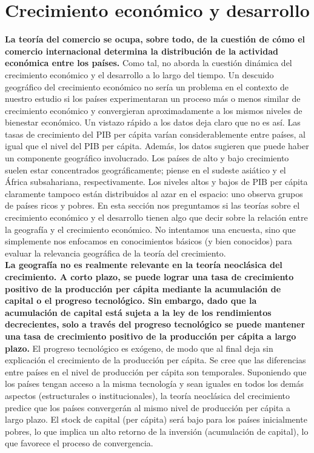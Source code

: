 \section{Crecimiento económico y desarrollo}
\textbf{La teoría del comercio se ocupa, sobre todo, de la cuestión de cómo el comercio internacional determina la distribución de la actividad económica entre los países.} Como tal, no aborda la cuestión dinámica del crecimiento económico y el desarrollo a lo largo del tiempo. Un descuido geográfico del crecimiento económico no sería un problema en el contexto de nuestro estudio si los países experimentaran un proceso más o menos similar de crecimiento económico y convergieran aproximadamente a los mismos niveles de bienestar económico. Un vistazo rápido a los datos deja claro que no es así. Las tasas de crecimiento del PIB per cápita varían considerablemente entre países, al igual que el nivel del PIB per cápita. Además, los datos sugieren que puede haber un componente geográfico involucrado. Los países de alto y bajo crecimiento suelen estar concentrados geográficamente; piense en el sudeste asiático y el África subsahariana, respectivamente. Los niveles altos y bajos de PIB per cápita claramente tampoco están distribuidos al azar en el espacio: uno observa grupos de países ricos y pobres. En esta sección nos preguntamos si las teorías sobre el crecimiento económico y el desarrollo tienen algo que decir sobre la relación entre la geografía y el crecimiento económico. No intentamos una encuesta, sino que simplemente nos enfocamos en conocimientos básicos (y bien conocidos) para evaluar la relevancia geográfica de la teoría del crecimiento.\\
\textbf{La geografía no es realmente relevante en la teoría neoclásica del crecimiento. A corto plazo, se puede lograr una tasa de crecimiento positivo de la producción per cápita mediante la acumulación de capital o el progreso tecnológico. Sin embargo, dado que la acumulación de capital está sujeta a la ley de los rendimientos decrecientes, solo a través del progreso tecnológico se puede mantener una tasa de crecimiento positivo de la producción per cápita a largo plazo.} El progreso tecnológico es exógeno, de modo que al final deja sin explicación el crecimiento de la producción per cápita. Se cree que las diferencias entre países en el nivel de producción per cápita son temporales. Suponiendo que los países tengan acceso a la misma tecnología y sean iguales en todos los demás aspectos (estructurales o institucionales), la teoría neoclásica del crecimiento predice que los países convergerán al mismo nivel de producción per cápita a largo plazo. El stock de capital (per cápita) será bajo para los países inicialmente pobres, lo que implica un alto retorno de la inversión (acumulación de capital), lo que favorece el proceso de convergencia.\\
